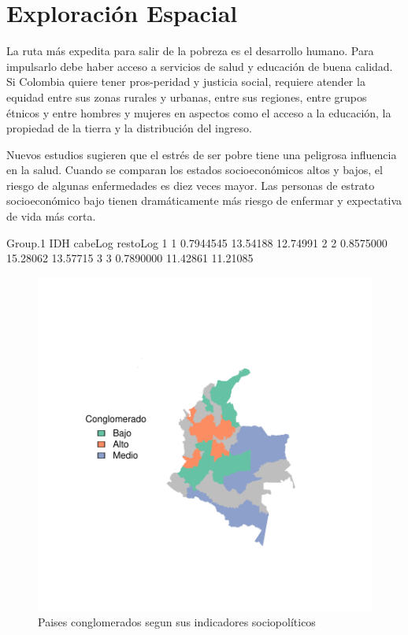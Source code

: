 \section{Exploración Espacial}\label{espacial}

La ruta más expedita para salir de la pobreza es el desarrollo humano. Para impulsarlo debe haber acceso a servicios de salud y educación de buena calidad. Si Colombia quiere tener pros-peridad y justicia social, requiere atender la equidad entre sus zonas rurales y urbanas, entre sus regiones, entre grupos étnicos y entre hombres y mujeres en aspectos como el acceso a la educación, la propiedad de la tierra y la distribución del ingreso.




Nuevos estudios sugieren que el estrés de ser pobre tiene una peligrosa influencia en la salud. Cuando se comparan los estados socioeconómicos altos y bajos, el riesgo de algunas enfermedades es diez veces mayor. Las personas de estrato socioeconómico bajo tienen dramáticamente más riesgo de enfermar y expectativa de vida más corta.


\begin{Schunk}
\begin{Soutput}
  Group.1       IDH  cabeLog restoLog
1       1 0.7944545 13.54188 12.74991
2       2 0.8575000 15.28062 13.57715
3       3 0.7890000 11.42861 11.21085
\end{Soutput}
\end{Schunk}


\begin{figure}[h]
\includegraphics{Espacial-plotMap1}
\caption{Paises conglomerados segun sus indicadores sociopolíticos}\label{clustmap}
\end{figure}

